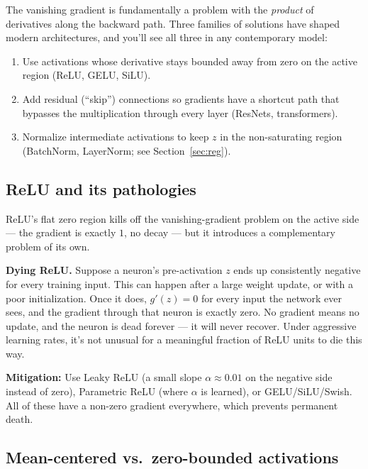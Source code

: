 \documentclass[11pt, a4paper]{article}
\begin{document}
\begin{keybox}
The vanishing gradient is fundamentally a problem with the \emph{product} of derivatives along the backward path. Three families of solutions have shaped modern architectures, and you'll see all three in any contemporary model:
\begin{enumerate}[leftmargin=*, label=(\arabic*)]
    \item Use activations whose derivative stays bounded away from zero on the active region (ReLU, GELU, SiLU).
    \item Add residual (``skip'') connections so gradients have a shortcut path that bypasses the multiplication through every layer (ResNets, transformers).
    \item Normalize intermediate activations to keep $z$ in the non-saturating region (BatchNorm, LayerNorm; see Section~\ref{sec:reg}).
\end{enumerate}
\end{keybox}

\subsection{ReLU and its pathologies}

ReLU's flat zero region kills off the vanishing-gradient problem on the active side --- the gradient is exactly $1$, no decay --- but it introduces a complementary problem of its own.

\begin{warningbox}
\textbf{Dying ReLU.} Suppose a neuron's pre-activation $z$ ends up consistently negative for every training input. This can happen after a large weight update, or with a poor initialization. Once it does, $g'(z) = 0$ for every input the network ever sees, and the gradient through that neuron is exactly zero. No gradient means no update, and the neuron is dead forever --- it will never recover. Under aggressive learning rates, it's not unusual for a meaningful fraction of ReLU units to die this way.

\smallskip
\textbf{Mitigation:} Use Leaky ReLU (a small slope $\alpha \approx 0.01$ on the negative side instead of zero), Parametric ReLU (where $\alpha$ is learned), or GELU/SiLU/Swish. All of these have a non-zero gradient everywhere, which prevents permanent death.
\end{warningbox}

\subsection{Mean-centered vs.\ zero-bounded activations}
\end{document}
